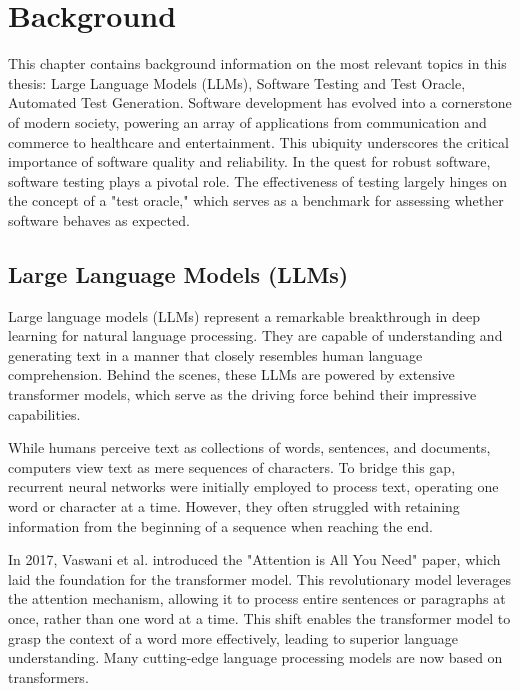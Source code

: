 \chapter{Background}
\label{cha:background}
\vspace{0.4 cm}

This chapter contains background information on the most relevant topics in this thesis: Large Language Models (LLMs), Software Testing and Test Oracle, Automated Test Generation.
Software development has evolved into a cornerstone of modern society, powering an array of applications from communication and commerce to healthcare and entertainment. This ubiquity underscores the critical importance of software quality and reliability. In the quest for robust software, software testing plays a pivotal role. The effectiveness of testing largely hinges on the concept of a "test oracle," which serves as a benchmark for assessing whether software behaves as expected.

\section{Large Language Models (LLMs)}
\label{sec:llms}
\vspace{0.2 cm}

Large language models (LLMs) represent a remarkable breakthrough in deep learning for natural language processing. They are capable of understanding and generating text in a manner that closely resembles human language comprehension. Behind the scenes, these LLMs are powered by extensive transformer models, which serve as the driving force behind their impressive capabilities.

While humans perceive text as collections of words, sentences, and documents, computers view text as mere sequences of characters. To bridge this gap, recurrent neural networks were initially employed to process text, operating one word or character at a time. However, they often struggled with retaining information from the beginning of a sequence when reaching the end.

In 2017, Vaswani et al. introduced the "Attention is All You Need"\cite{vaswani_attention_2017} paper, which laid the foundation for the transformer model. This revolutionary model leverages the attention mechanism, allowing it to process entire sentences or paragraphs at once, rather than one word at a time. This shift enables the transformer model to grasp the context of a word more effectively, leading to superior language understanding. Many cutting-edge language processing models are now based on transformers.

